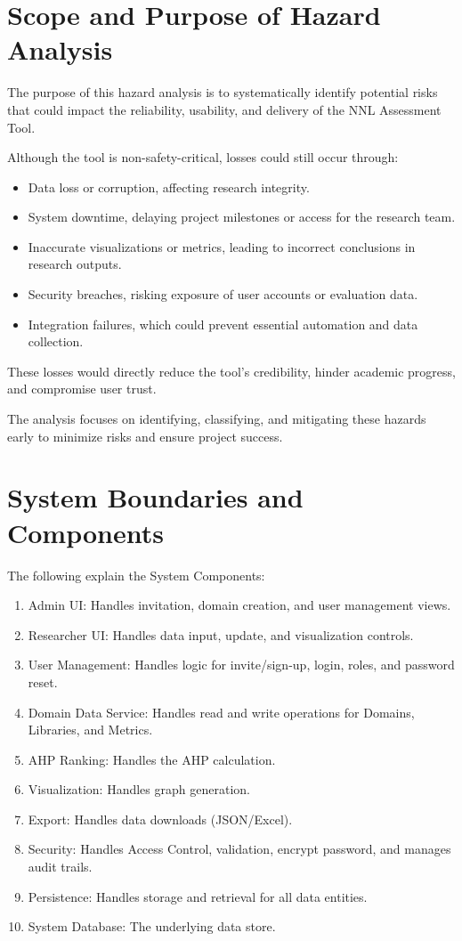 \documentclass{article}
\begin{document}
\section{Scope and Purpose of Hazard Analysis}

The purpose of this hazard analysis is to systematically identify potential
risks that could impact the reliability, usability, and delivery of the NNL
Assessment Tool.

Although the tool is non-safety-critical, losses could still occur through:

\begin{itemize}
    \item Data loss or corruption, affecting research integrity.
    \item System downtime, delaying project milestones or access for the research team.
    \item Inaccurate visualizations or metrics, leading to incorrect conclusions in research outputs.
    \item Security breaches, risking exposure of user accounts or evaluation data.
    \item Integration failures, which could prevent essential automation and data collection.
\end{itemize}

These losses would directly reduce the tool’s credibility, hinder academic
progress, and compromise user trust.

The analysis focuses on identifying, classifying, and mitigating these hazards
early to minimize risks and ensure project success.

\section{System Boundaries and Components}

The following explain the System Components:
\begin{enumerate}[label=C\arabic*.]
  \item Admin UI: Handles invitation, domain creation, and user management views.
  \item Researcher UI: Handles data input, update, and visualization controls.
  \item User Management: Handles logic for invite/sign-up, login, roles, and password reset.
  \item Domain Data Service: Handles read and write operations for Domains, Libraries, and Metrics.
  \item AHP Ranking: Handles the AHP calculation.
  \item Visualization: Handles graph generation.
  \item Export: Handles data downloads (JSON/Excel).
  \item Security: Handles Access Control, validation, encrypt password, and manages audit trails.
  \item Persistence: Handles storage and retrieval for all data entities.
  \item System Database: The underlying data store.
\end{enumerate}
\end{document}
